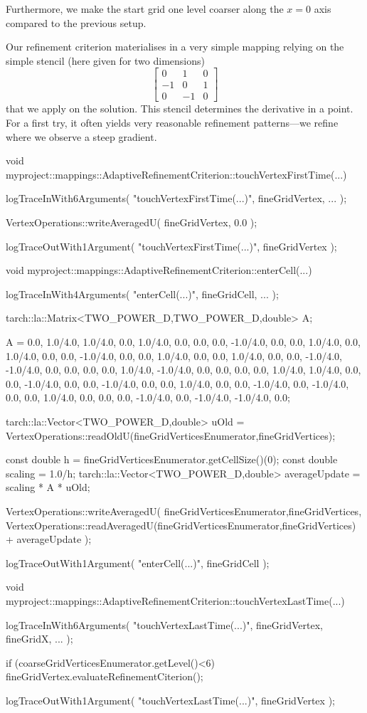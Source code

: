 \noindent
Furthermore, we make the start grid one level coarser along the $x=0$ axis 
compared to the previous setup.

Our refinement criterion materialises in a very simple mapping relying on the
simple stencil (here given for two dimensions)
\[
\left[ \begin{array}{ccc}
  0 & 1 & 0 \\
  -1 & 0 & 1 \\
  0 & -1 & 0
\end{array}  \right]
\]
that we apply on the solution.
This stencil determines the derivative in a point.
For a first try, it often yields very reasonable refinement patterns---we
refine where we observe a steep gradient.

\begin{code}
void myproject::mappings::AdaptiveRefinementCriterion::touchVertexFirstTime(...) { 
  logTraceInWith6Arguments( "touchVertexFirstTime(...)", fineGridVertex, ... );

  VertexOperations::writeAveragedU( fineGridVertex, 0.0 );

  logTraceOutWith1Argument( "touchVertexFirstTime(...)", fineGridVertex );
}


void myproject::mappings::AdaptiveRefinementCriterion::enterCell(...) {
  logTraceInWith4Arguments( "enterCell(...)", fineGridCell, ... );

  tarch::la::Matrix<TWO_POWER_D,TWO_POWER_D,double> A;

  A =  0.0,  1.0/4.0,  1.0/4.0,  0.0,  1.0/4.0,  0.0,  0.0,  0.0,
      -1.0/4.0,  0.0,  0.0,  1.0/4.0,  0.0,  1.0/4.0,  0.0,  0.0,
      -1.0/4.0,  0.0,  0.0,  1.0/4.0,  0.0,  0.0,  1.0/4.0,  0.0,
       0.0, -1.0/4.0, -1.0/4.0,  0.0,  0.0,  0.0,  0.0,  1.0/4.0,
      -1.0/4.0,  0.0,  0.0,  0.0,  0.0,  1.0/4.0,  1.0/4.0,  0.0,
       0.0, -1.0/4.0,  0.0,  0.0, -1.0/4.0,  0.0,  0.0,  1.0/4.0,
       0.0,  0.0, -1.0/4.0,  0.0, -1.0/4.0,  0.0,  0.0,  1.0/4.0,
       0.0,  0.0,  0.0, -1.0/4.0,  0.0, -1.0/4.0, -1.0/4.0,  0.0;

  tarch::la::Vector<TWO_POWER_D,double> uOld = 
    VertexOperations::readOldU(fineGridVerticesEnumerator,fineGridVertices);

  const double h       = fineGridVerticesEnumerator.getCellSize()(0);
  const double scaling = 1.0/h;
  tarch::la::Vector<TWO_POWER_D,double> averageUpdate = scaling * A * uOld;

  VertexOperations::writeAveragedU(
    fineGridVerticesEnumerator,fineGridVertices,
    VertexOperations::readAveragedU(fineGridVerticesEnumerator,fineGridVertices) 
    + averageUpdate
  );
 
  logTraceOutWith1Argument( "enterCell(...)", fineGridCell );
}


void myproject::mappings::AdaptiveRefinementCriterion::touchVertexLastTime(...) { 
  logTraceInWith6Arguments( "touchVertexLastTime(...)", fineGridVertex, fineGridX, ... );

  if (coarseGridVerticesEnumerator.getLevel()<6) {
    fineGridVertex.evaluateRefinementCiterion();
  }

  logTraceOutWith1Argument( "touchVertexLastTime(...)", fineGridVertex );
}

\end{code}


